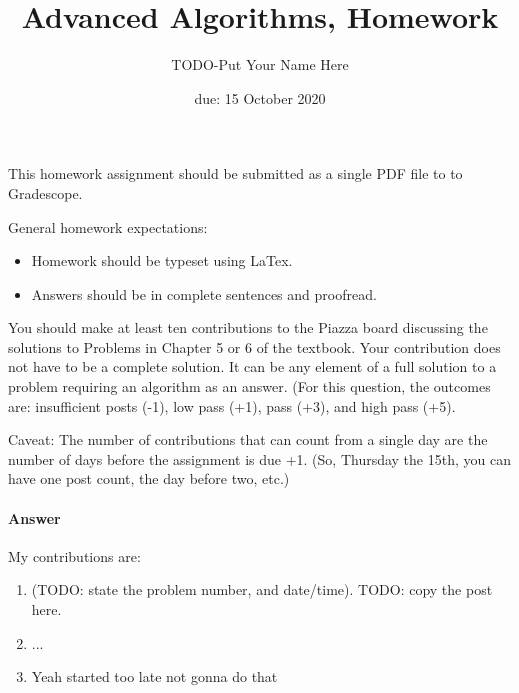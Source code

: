 \documentclass{article}
\title{Advanced Algorithms, Homework \hwnum}
\author{TODO-Put Your Name Here}
\date{due: 15 October 2020}
\begin{document}
\maketitle

This homework assignment should be
submitted as a single PDF file to to Gradescope.

General homework expectations:
\begin{itemize}
    \item Homework should be typeset using LaTex.
    \item Answers should be in complete sentences and proofread.
\end{itemize}

\nextprob
{}

You should make at least ten contributions to the Piazza board
discussing the solutions to Problems in Chapter 5 or 6 of the textbook.  Your
contribution does not have to be a complete solution.  It can be any element of
a full solution to a problem requiring an algorithm as an answer.  (For this
question, the outcomes are: insufficient posts (-1), low pass (+1), pass (+3),
and high pass (+5).

Caveat: The number of contributions that can count from a single day are the
number of days before the assignment is due +1.  (So, Thursday the 15th, you can
have one post count, the day before two, etc.)

\paragraph{Answer}


My contributions are:
\begin{enumerate}
    \item (TODO: state the problem number, and date/time). TODO:
        copy the post here.
    \item ...
    \item Yeah started too late not gonna do that
\end{enumerate}


\nextprob
{}
\end{document}
